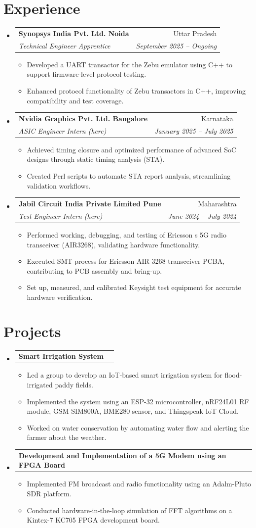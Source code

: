 \documentclass[letterpaper,11pt]{article}
\makeatletter
\newcommand{\resumeItem}[1]{\item\small{#1 \vspace{-2pt}}}
\newcommand{\resumeSubheading}[4]{
  \vspace{-2pt}\item
    \begin{tabular*}{\textwidth}[t]{l@{\extracolsep{\fill}}r}
      \textbf{#1} & #2 \\
      \textit{\small#3} & \textit{\small #4} \\
    \end{tabular*}\vspace{-7pt}
}
\newcommand{\resumeProjectHeading}[2]{
    \item
    \begin{tabular*}{\textwidth}{l@{\extracolsep{\fill}}r}
      \small#1 & #2 \\
    \end{tabular*}\vspace{-7pt}
}
\newcommand{\resumeSubHeadingListStart}{\begin{itemize}[leftmargin=0.15in, label={}]}
\newcommand{\resumeSubHeadingListEnd}{\end{itemize}}
\newcommand{\resumeItemListStart}{\begin{itemize}}
\newcommand{\resumeItemListEnd}{\end{itemize}\vspace{-5pt}}
\makeatother
\begin{document}
\section{Experience}
\resumeSubHeadingListStart
  \resumeSubheading
    { Synopsys India Pvt. Ltd. Noida }{ Uttar Pradesh }
    { Technical Engineer Apprentice }{ September 2025 -- Ongoing }
    \resumeItemListStart
      \resumeItem{ Developed a UART transactor for the Zebu emulator using C++ to support firmware-level protocol testing. }
      \resumeItem{ Enhanced protocol functionality of Zebu transactors in C++, improving compatibility and test coverage. }
    \resumeItemListEnd
  \resumeSubheading
    { Nvidia Graphics Pvt. Ltd. Bangalore }{ Karnataka }
    { ASIC Engineer Intern (here) }{ January 2025 -- July 2025 }
    \resumeItemListStart
      \resumeItem{ Achieved timing closure and optimized performance of advanced SoC designs through static timing analysis (STA). }
      \resumeItem{ Created Perl scripts to automate STA report analysis, streamlining validation workflows. }
    \resumeItemListEnd
  \resumeSubheading
    { Jabil Circuit India Private Limited Pune }{ Maharashtra }
    { Test Engineer Intern (here) }{ June 2024 -- July 2024 }
    \resumeItemListStart
      \resumeItem{ Performed working, debugging, and testing of Ericsson s 5G radio transceiver (AIR3268), validating hardware functionality. }
      \resumeItem{ Executed SMT process for Ericsson AIR 3268 transceiver PCBA, contributing to PCB assembly and bring-up. }
      \resumeItem{ Set up, measured, and calibrated Keysight test equipment for accurate hardware verification. }
    \resumeItemListEnd
\resumeSubHeadingListEnd

\section{Projects}
\resumeSubHeadingListStart
  \resumeProjectHeading
    {\textbf{ Smart Irrigation System }}{  }
    \resumeItemListStart
      \resumeItem{ Led a group to develop an IoT-based smart irrigation system for flood-irrigated paddy fields. }
      \resumeItem{ Implemented the system using an ESP-32 microcontroller, nRF24L01 RF module, GSM SIM800A, BME280 sensor, and Thingspeak IoT Cloud. }
      \resumeItem{ Worked on water conservation by automating water flow and alerting the farmer about the weather. }
    \resumeItemListEnd
  \resumeProjectHeading
    {\textbf{ Development and Implementation of a 5G Modem using an FPGA Board }}{  }
    \resumeItemListStart
      \resumeItem{ Implemented FM broadcast and radio functionality using an Adalm-Pluto SDR platform. }
      \resumeItem{ Conducted hardware-in-the-loop simulation of FFT algorithms on a Kintex-7 KC705 FPGA development board. }
    \resumeItemListEnd
\resumeSubHeadingListEnd
\end{document}
